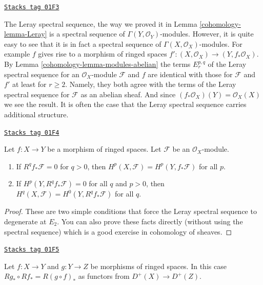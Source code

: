 \begin{remark}
\label{cohomology-remark-Leray-ss-more-structure}
\href{https://stacks.math.columbia.edu/tag/01F3}{\texttt{Stacks tag 01F3}}

The Leray spectral sequence, the way we proved it in Lemma \ref{cohomology-lemma-Leray}
is a spectral sequence of $\Gamma(Y, \mathcal{O}_Y)$-modules. However, it
is quite easy to see that it is in fact a spectral sequence of
$\Gamma(X, \mathcal{O}_X)$-modules. For example $f$ gives rise to
a morphism of ringed spaces
$f' :  (X, \mathcal{O}_X) \to (Y, f_*\mathcal{O}_X)$.
By Lemma \ref{cohomology-lemma-modules-abelian} the terms $E_r^{p, q}$ of the
Leray spectral sequence for an $\mathcal{O}_X$-module $\mathcal{F}$
and $f$ are identical with those for $\mathcal{F}$ and $f'$
at least for $r \geq 2$. Namely, they both agree with the terms of the Leray
spectral sequence for $\mathcal{F}$ as an abelian sheaf.
And since $(f_*\mathcal{O}_X)(Y) = \mathcal{O}_X(X)$ we see the result.
It is often the case
that the Leray spectral sequence carries additional structure.
\end{remark}

\begin{lemma}
\label{cohomology-lemma-apply-Leray}
\href{https://stacks.math.columbia.edu/tag/01F4}{\texttt{Stacks tag 01F4}}

Let $f : X \to Y$ be a morphism of ringed spaces.
Let $\mathcal{F}$ be an $\mathcal{O}_X$-module.
\begin{enumerate}
\item If $R^qf_*\mathcal{F} = 0$ for $q > 0$, then
$H^p(X, \mathcal{F}) = H^p(Y, f_*\mathcal{F})$ for all $p$.
\item If $H^p(Y, R^qf_*\mathcal{F}) = 0$ for all $q$ and $p > 0$, then
$H^q(X, \mathcal{F}) = H^0(Y, R^qf_*\mathcal{F})$ for all $q$.
\end{enumerate}
\end{lemma}

\begin{proof}
These are two simple conditions that force the Leray spectral sequence to
degenerate at $E_2$. You can also prove these facts directly (without using
the spectral sequence) which is a good exercise in cohomology of sheaves.
\end{proof}

\begin{lemma}
\label{cohomology-lemma-higher-direct-images-compose}
\href{https://stacks.math.columbia.edu/tag/01F5}{\texttt{Stacks tag 01F5}}


Let $f : X \to Y$ and $g : Y \to Z$ be morphisms of ringed spaces.
In this case $Rg_* \circ Rf_* = R(g \circ f)_*$ as functors
from $D^{+}(X) \to D^{+}(Z)$.
\end{lemma}

